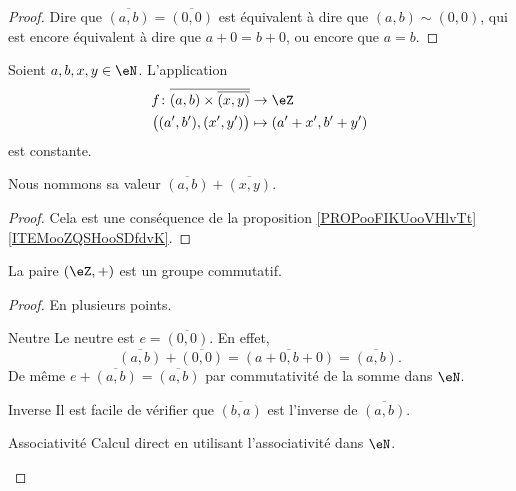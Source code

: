 \begin{proof}
    Dire que \( \overline{ (a,b) }=\overline{ (0,0) }\) est équivalent à dire que \( (a,b)\sim (0,0)\), qui est encore équivalent à dire que \( a+0=b+0\), ou encore que \( a=b\).
\end{proof}

\begin{propositionDef}
    Soient \( a,b,x,y\in \eN\). L'application
    \begin{equation}
        \begin{aligned}
            f\colon \overline{ (a,b)\times \overline{ (x,y) } }&\to \eZ \\
            \big( (a',b'),(x',y') \big)&\mapsto (a'+x',b'+y') 
        \end{aligned}
    \end{equation}
    est constante.

    Nous nommons sa valeur \( \overline{ (a,b) }+\overline{ (x,y) }\).
\end{propositionDef}

\begin{proof}
    Cela est une conséquence de la proposition \ref{PROPooFIKUooVHlvTt}\ref{ITEMooZQSHooSDfdvK}.
\end{proof}


\begin{proposition}
    La paire \( (\eZ,+)\) est un groupe commutatif.
\end{proposition}

\begin{proof}
    En plusieurs points.
    \begin{subproof}
    \item[Neutre]
        Le neutre est \( e=\overline{ (0,0) }\). En effet,
        \begin{equation}
            \overline{ (a,b) }+\overline{ (0,0) }=\overline{ (a+0,b+0) }=\overline{ (a,b) }.
        \end{equation}
        De même \( e+\overline{ (a,b) }=\overline{ (a,b) }\) par commutativité de la somme dans \( \eN\).
    \item[Inverse]
        Il est facile de vérifier que \( \overline{ (b,a) }\) est l'inverse de \( \overline{ (a,b) }\).
    \item[Associativité]
        Calcul direct en utilisant l'associativité dans \( \eN\).
    \end{subproof}
\end{proof}


